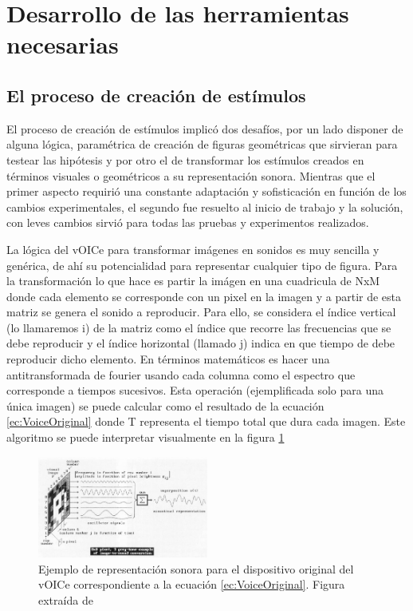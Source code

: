 \documentclass{article}
\begin{document}
\section{Desarrollo de las herramientas necesarias}

\subsection{El proceso de creación de estímulos} \label{seccion:SVG}
    
    El proceso de creación de estímulos implicó dos desafíos, por un lado disponer de alguna lógica, paramétrica de creación de figuras geométricas que sirvieran para testear las hipótesis y por otro el de transformar los estímulos creados en términos visuales o geométricos a su representación sonora. Mientras que el primer aspecto requirió una constante adaptación y sofisticación en función de los cambios experimentales, el segundo fue resuelto al inicio de trabajo y la solución, con leves cambios sirvió para todas las pruebas y experimentos realizados. 
    
    La lógica del vOICe para transformar imágenes en sonidos es muy sencilla y genérica, de ahí su potencialidad para representar cualquier tipo de figura. Para la transformación lo que hace es partir la imágen en una cuadricula de NxM donde cada elemento se corresponde con un pixel en la imagen y a partir de esta matriz se genera el sonido a reproducir. Para ello, se considera el índice vertical (lo llamaremos i) de la matriz como el índice que recorre las frecuencias que se debe reproducir y el índice horizontal (llamado j) indica en que tiempo de debe reproducir dicho elemento. En términos matemáticos es hacer una antitransformada de fourier usando cada columna como el espectro que corresponde a tiempos sucesivos. Esta operación (ejemplificada solo para una única imagen) se puede calcular como el resultado de la ecuación \ref{ec:VoiceOriginal} donde T representa el tiempo total que dura cada imagen. Este algoritmo se puede interpretar visualmente en la figura \ref{fig:VoiceOriginal}
    
    \begin{figure}
        \center
        \includegraphics[width=0.5\textwidth]{Imagenes/VoiceOriginal.png}
        \caption{Ejemplo de representación sonora para el dispositivo original del vOICe correspondiente a la ecuación \ref{ec:VoiceOriginal}. Figura extraída de \cite{Voice1}}
        \label{fig:VoiceOriginal}
    \end{figure}
    
\end{document}
